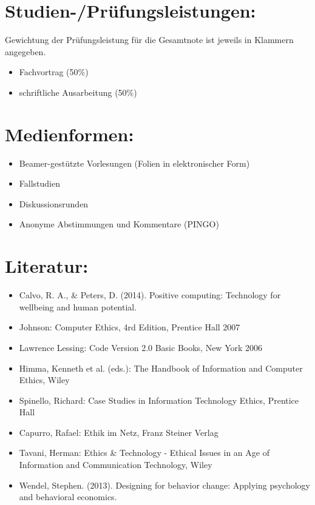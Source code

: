 \section*{Studien-/Prüfungsleistungen:}\label{studien-pruxfcfungsleistungen}

Gewichtung der Prüfungsleistung für die Gesamtnote ist jeweils in
Klammern angegeben.

\begin{itemize}
\tightlist
\item
  Fachvortrag (50\%)
\item
  schriftliche Ausarbeitung (50\%)
\end{itemize}

\section*{Medienformen:}\label{medienformen}

\begin{itemize}
\tightlist
\item
  Beamer-gestützte Vorlesungen (Folien in elektronischer Form)
\item
  Fallstudien
\item
  Diskussionsrunden
\item
  Anonyme Abstimmungen und Kommentare (PINGO)
\end{itemize}

\section*{Literatur:}\label{literatur}

\begin{itemize}
\tightlist
\item
  Calvo, R. A., \& Peters, D. (2014). Positive computing: Technology for
  wellbeing and human potential.
\item
  Johnson: Computer Ethics, 4rd Edition, Prentice Hall 2007
\item
  Lawrence Lessing: Code Version 2.0 Basic Books, New York 2006
\item
  Himma, Kenneth et al. (eds.): The Handbook of Information and Computer
  Ethics, Wiley
\item
  Spinello, Richard: Case Studies in Information Technology Ethics,
  Prentice Hall
\item
  Capurro, Rafael: Ethik im Netz, Franz Steiner Verlag
\item
  Tavani, Herman: Ethics \& Technology - Ethical Issues in an Age of
  Information and Communication Technology, Wiley
\item
  Wendel, Stephen. (2013). Designing for behavior change: Applying
  psychology and behavioral economics.
\end{itemize}

